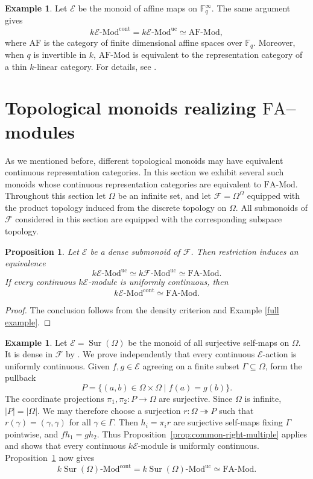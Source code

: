 \documentclass[10pt, reqno]{amsart}
\theoremstyle{plain}
\newtheorem{proposition}[theorem]{Proposition}
\numberwithin{equation}{section}
\theoremstyle{definition}
\newtheorem{example}[theorem]{Example}
\newcommand{\Mod}{{\textrm{-}\mathrm{Mod}}}
\newcommand{\FA}{\mathrm{FA}}
\newcommand{\E}{\mathscr E}
\begin{document}
\begin{example}
Let $\E$ be the monoid of affine maps on $\mathbb{F}_q^{\infty}$. The same argument gives
\[
k\E \Mod^{\mathrm{cont}} = k\E \Mod^{\mathrm{uc}} \simeq \mathrm{AF} \Mod,
\]
where $\mathrm{AF}$ is the category of finite dimensional affine spaces over $\mathbb{F}_q$. Moreover, when $q$ is invertible in $k$, $\mathrm{AF} \Mod$ is equivalent to the representation category of a thin $k$-linear category. For details, see \cite{LiNorm}.
\end{example}


\section{Topological monoids realizing \texorpdfstring{$\FA$}{FA}--modules}

As we mentioned before, different topological monoids may have equivalent continuous representation categories. In this section we exhibit several such monoids whose continuous representation categories are equivalent to $\FA \Mod$. Throughout this section let $\Omega$ be an infinite set, and let $\mathscr F = \Omega^\Omega$ equipped with the product topology induced from the discrete topology on $\Omega$. All submonoids of $\mathscr{F}$ considered in this section are equipped with the corresponding subspace topology.

\begin{proposition}\label{prop:dense-full-FA}
Let $\E$ be a dense submonoid of $\mathscr F$. Then restriction induces an equivalence
\[
k\mathscr{E} \Mod^{\mathrm{uc}} \simeq k\mathscr{F} \Mod^{\mathrm{uc}} \simeq \FA \Mod.
\]
If every continuous $k\E$-module is uniformly continuous, then
\[
k\E\Mod^{\mathrm{cont}} \simeq \FA \Mod.
\]
\end{proposition}

\begin{proof}
The conclusion follows from the density criterion \cite[Corollary~7.12]{LiRel} and Example \ref{full example}.
\end{proof}

\begin{example}\label{ex:surjective-FA}
Let $\E = \operatorname{Sur}(\Omega)$ be the monoid of all surjective self-maps on $\Omega$. It is dense in $\mathscr F$ by \cite[Example~7.15]{LiRel}. We prove independently that every continuous $\E$-action is uniformly continuous. Given $f,g \in \E$ agreeing on a finite subset $\Gamma \subseteq \Omega$, form the pullback
\[
P = \{(a, b) \in \Omega \times \Omega \mid f(a) = g(b)\}.
\]
The coordinate projections $\pi_1,\pi_2:P\to\Omega$ are surjective. Since $\Omega$ is infinite, $|P| = |\Omega|$. We may therefore choose a surjection $r: \Omega \twoheadrightarrow P$ such that $r(\gamma) = (\gamma, \gamma)$ for all $\gamma \in \Gamma$. Then $h_i=\pi_i r$ are surjective self-maps fixing $\Gamma$ pointwise, and $f h_1=g h_2$. Thus Proposition~\ref{prop:common-right-multiple} applies and shows that every continuous $k\E$-module is uniformly continuous. Proposition~\ref{prop:dense-full-FA} now gives
\[
k\operatorname{Sur}(\Omega)\Mod^{\mathrm{cont}}   =k\operatorname{Sur}(\Omega)\Mod^{\mathrm{uc}} \simeq \FA \Mod.
\]
\end{example}
\end{document}
